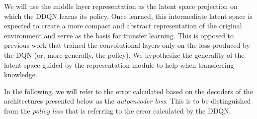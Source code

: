 We will use the middle layer representation as the latent space projection on which the DDQN learns its policy.
Once learned, this intermediate latent space is expected to create a more compact and abstract representation of the original environment and serve as the basis for transfer learning. This is opposed to previous work that trained the convolutional layers only on the loss produced by the DQN (or, more generally, the policy). We hypothesize the generality of the latent space guided by the representation module to help when transferring knowledge. 

In the following, we will refer to the error calculated based on the decoders of the architectures presented below as the \textit{autoencoder loss}. This is to be distinguished from the \textit{policy loss} that is referring to the error calculated by the DDQN.


